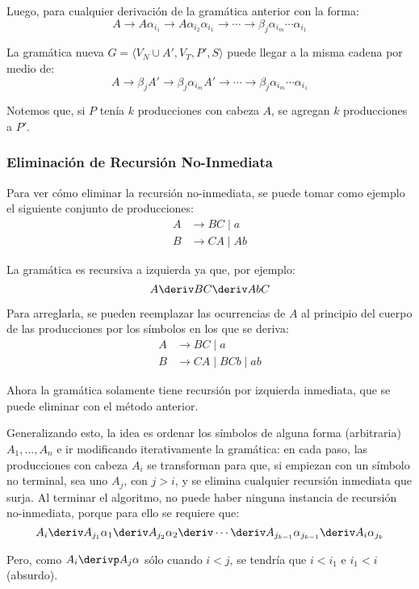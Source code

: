 Luego, para cualquier derivación de la gramática anterior con la forma:
$$
    A \to A \alpha_{i_1} \to A \alpha_{i_2} \alpha_{i_1} \to \cdots \to \beta_j \alpha_{i_m} \cdots \alpha_{i_1}
$$

La gramática nueva $G = \langle V_N \cup A', V_T, P', S \rangle$ puede llegar a la misma cadena por medio de:
$$
    A \to \beta_j A' \to \beta_j \alpha_{i_m} A' \to \cdots \to \beta_j \alpha_{i_m} \cdots \alpha_{i_1}
$$

Notemos que, si $P$ tenía $k$ producciones con cabeza $A$, se agregan $k$ producciones a $P'$.

\subsubsection{Eliminación de Recursión No-Inmediata}

Para ver cómo eliminar la recursión no-inmediata, se puede tomar como ejemplo el siguiente conjunto de producciones:
$$
\begin{aligned}
    A & \to BC \mid a \\
    B & \to CA \mid Ab
\end{aligned}
$$

La gramática es recursiva a izquierda ya que, por ejemplo:
$$
    A \deriv BC \deriv AbC
$$

Para arreglarla, se pueden reemplazar las ocurrencias de $A$ al principio del cuerpo de las producciones por los símbolos en los que se deriva:
$$
\begin{aligned}
    A & \to BC \mid a \\
    B & \to CA \mid BCb \mid ab
\end{aligned}
$$

Ahora la gramática solamente tiene recursión por izquierda inmediata, que se puede eliminar con el método anterior.

Generalizando esto, la idea es ordenar los símbolos de alguna forma (arbitraria) $A_1, \dots, A_n$ e ir modificando iterativamente la gramática: en cada paso, las producciones con cabeza $A_i$ se transforman para que, si empiezan con un símbolo no terminal, sea uno $A_j$, con $j > i$, y se elimina cualquier recursión inmediata que surja. Al terminar el algoritmo, no puede haber ninguna instancia de recursión no-inmediata, porque para ello se requiere que:
$$
    A_i \deriv A_{j_1} \alpha_1 \deriv A_{j_2} \alpha_2 \deriv \cdots \deriv A_{j_{k - 1}} \alpha_{j_{k - 1}}\deriv A_i \alpha_{j_k}
$$

Pero, como $A_i \derivp A_j \alpha$ sólo cuando $i < j$, se tendría que $i < i_1$ e $i_1 < i$ (absurdo).

